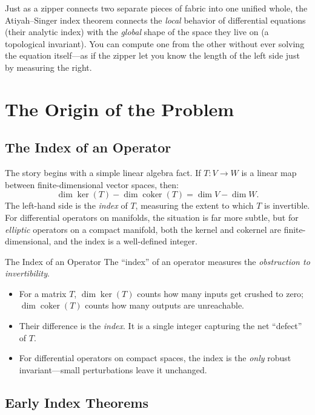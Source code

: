 \begin{analogy}
Just as a zipper connects two separate pieces of fabric into one unified whole, the Atiyah--Singer index theorem connects the \emph{local} behavior of differential equations (their analytic index) with the \emph{global} shape of the space they live on (a topological invariant). You can compute one from the other without ever solving the equation itself---as if the zipper let you know the length of the left side just by measuring the right.
\end{analogy}

\section{The Origin of the Problem}

\subsection{The Index of an Operator}

The story begins with a simple linear algebra fact. If $T: V \to W$ is a linear map between finite-dimensional vector spaces, then:
\[
\dim \ker(T) - \dim \operatorname{coker}(T) = \dim V - \dim W.
\]
The left-hand side is the \emph{index} of $T$, measuring the extent to which $T$ is invertible. For differential operators on manifolds, the situation is far more subtle, but for \emph{elliptic} operators on a compact manifold, both the kernel and cokernel are finite-dimensional, and the index is a well-defined integer.

\begin{knowledgebridge}{The Index of an Operator}
The ``index'' of an operator measures the \emph{obstruction to invertibility}.
\begin{itemize}
    \item For a matrix $T$, $\dim \ker(T)$ counts how many inputs get crushed to zero; $\dim \operatorname{coker}(T)$ counts how many outputs are unreachable.
    \item Their difference is the \emph{index}. It is a single integer capturing the net ``defect'' of $T$.
    \item For differential operators on compact spaces, the index is the \emph{only} robust invariant---small perturbations leave it unchanged.
\end{itemize}
\end{knowledgebridge}

\subsection{Early Index Theorems}

